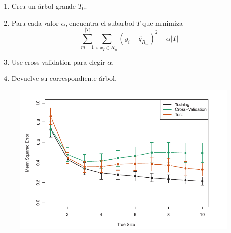\documentclass{beamer}
\theoremstyle{definition}
\begin{document}
\begin{frame}
\begin{enumerate}
	\item<1-> Crea un árbol grande $T_0$.
	\item<2-> Para cada valor $\alpha$, encuentra el subarbol $T$ que minimiza
	\[ \sum_{m=1}^{|T|} \sum_{i\colon x_I \in R_m} (y_i - \widehat{y}_{R_m})^2 + \alpha|T| \]
	\item<3-> Use cross-validation para elegir $\alpha$.
	\item<4-> Devuelve su correspondiente árbol.
\end{enumerate}
\end{frame}

\begin{frame}
\begin{figure}[h!]
\includegraphics[scale=0.4]{prunning}
\end{figure}
\end{frame}
\end{document}
